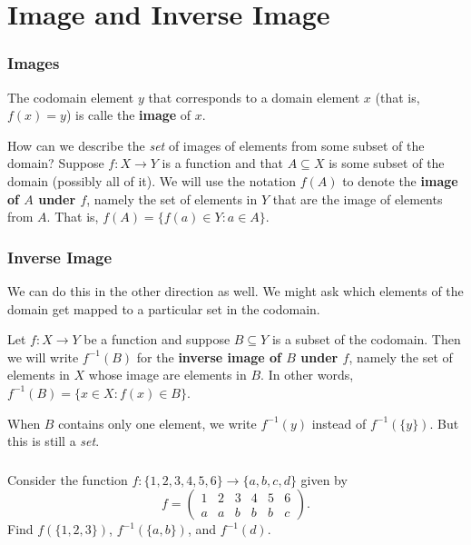 \documentclass[11pt, compress]{beamer}
\newcommand{\terminology}[1]{\textbf{#1}}\newcommand{\lt}{<}
\newcommand{\amp}{&}
\newcommand{\inv}{^{-1}}
\newcommand{\st}{:}
\begin{document}
\section{Image and Inverse Image}
\begin{frame}
\frametitle{Images}
 The codomain element \(y\) that corresponds to a domain element \(x\) (that is, \(f(x) = y\)) is calle the \terminology{image} of \(x\).
 
\pause \vfill 

How can we describe the \emph{set} of images of elements from some subset of the domain? Suppose \(f:X \to Y\) is a function and that \(A \subseteq X\) is some subset of the domain (possibly all of it). We will use the notation \(f(A)\) to denote the \terminology{image of \(A\) under \(f\)}, namely the set of elements in \(Y\) that are the image of elements from \(A\). That is, \(f(A) = \{f(a) \in Y \st a \in A\}\).
\end{frame}
 
\begin{frame}
\frametitle{Inverse Image}
 We can do this in the other direction as well. We might ask which elements of the domain get mapped to a particular set in the codomain.
 
\pause \vfill 

Let \(f:X \to Y\) be a function and suppose \(B \subseteq Y\) is a subset of the codomain. Then we will write \(f\inv(B)\) for the \terminology{inverse image of \(B\) under \(f\)}, namely the set of elements in \(X\) whose image are elements in \(B\). In other words, \(f\inv(B) = \{x \in X \st f(x) \in B\}\).
 
\pause \vfill 

When \(B\) contains only one element, we write \(f\inv(y)\) instead of \(f\inv(\{y\})\).  But this is still a \emph{set}.
\end{frame}
 
\begin{frame}
\frametitle{}
\begin{example}[0.4.8]Consider the function \(f:\{1,2,3,4,5,6\} \to \{a,b,c,d\}\) given by%
\begin{equation*}
f = \begin{pmatrix}1 \amp 2 \amp 3 \amp 4 \amp 5 \amp 6 \\ a \amp a \amp b \amp b \amp b \amp c\end{pmatrix}\text{.}
\end{equation*}
Find \(f(\{1,2,3\})\), \(f\inv(\{a,b\})\), and \(f\inv(d)\).
\end{example}
\end{frame}
 
\end{document}
